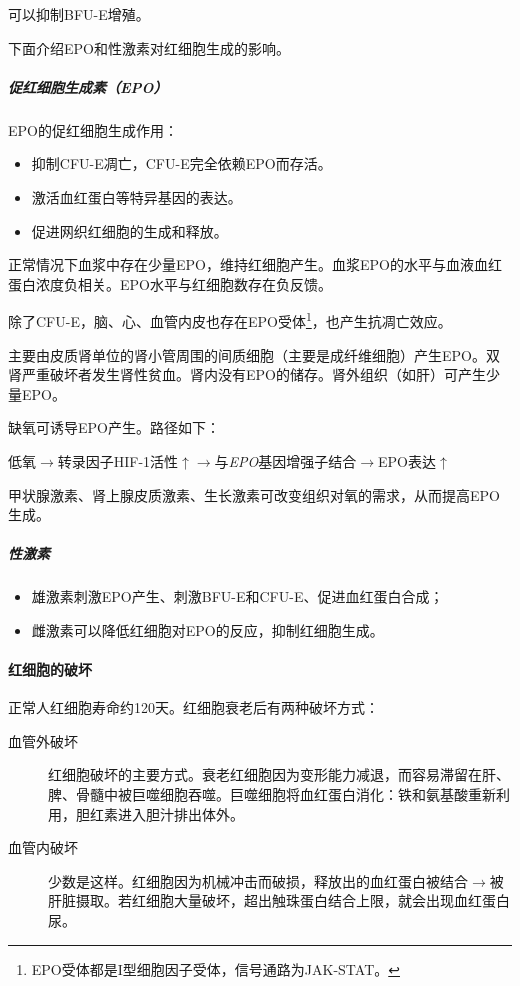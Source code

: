 可以抑制BFU-E增殖。


下面介绍EPO和性激素对红细胞生成的影响。

\subparagraph{促红细胞生成素（EPO）}

EPO的促红细胞生成作用：

\begin{itemize}
	\item 抑制CFU-E凋亡，CFU-E完全依赖EPO而存活。
	\item 激活血红蛋白等特异基因的表达。
	\item 促进网织红细胞的生成和释放。
\end{itemize}

正常情况下血浆中存在少量EPO，维持红细胞产生。血浆EPO的水平与血液血红蛋白浓度负相关。EPO水平与红细胞数存在负反馈。

除了CFU-E，脑、心、血管内皮也存在EPO受体\footnote{EPO受体都是I型细胞因子受体，信号通路为JAK-STAT。}，也产生抗凋亡效应。

主要由皮质肾单位的肾小管周围的间质细胞（主要是成纤维细胞）产生EPO。双肾严重破坏者发生肾性贫血。肾内没有EPO的储存。肾外组织（如肝）可产生少量EPO。

缺氧可诱导EPO产生。路径如下：

低氧$\longrightarrow$转录因子HIF-1活性$\uparrow$$\longrightarrow$与\textit{EPO}基因增强子结合$\longrightarrow$EPO表达$\uparrow$

甲状腺激素、肾上腺皮质激素、生长激素可改变组织对氧的需求，从而提高EPO生成。

\subparagraph{性激素}

\begin{itemize}
	\item 雄激素刺激EPO产生、刺激BFU-E和CFU-E、促进血红蛋白合成；
	\item 雌激素可以降低红细胞对EPO的反应，抑制红细胞生成。
\end{itemize}

\paragraph{红细胞的破坏}

正常人红细胞寿命约120天。红细胞衰老后有两种破坏方式：

\begin{description}
	\item[血管外破坏] 红细胞破坏的主要方式。衰老红细胞因为变形能力减退，而容易滞留在肝、脾、骨髓中被巨噬细胞吞噬。巨噬细胞将血红蛋白消化：铁和氨基酸重新利用，胆红素进入胆汁排出体外。
	\item[血管内破坏] 少数是这样。红细胞因为机械冲击而破损，释放出的血红蛋白被结合$\rightarrow$被肝脏摄取。若红细胞大量破坏，超出触珠蛋白结合上限，就会出现血红蛋白尿。
\end{description}

